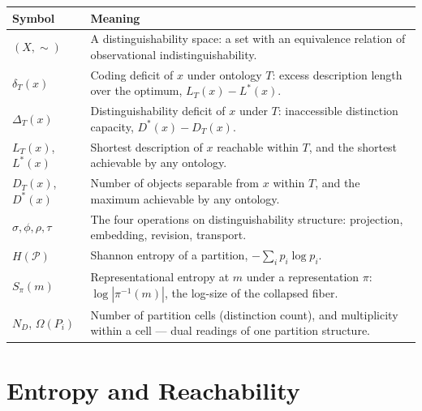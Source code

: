 \documentclass[12pt]{report}
\begin{document}
\begin{center}
\begin{tabular}{lp{4.6in}}
\hline
Symbol & Meaning \\
\hline
$(X,\sim)$ & A distinguishability space: a set with an equivalence
relation of observational indistinguishability. \\
$\delta_T(x)$ & Coding deficit of $x$ under ontology $T$: excess
description length over the optimum, $L_T(x) - L^*(x)$. \\
$\Delta_T(x)$ & Distinguishability deficit of $x$ under $T$: inaccessible
distinction capacity, $D^*(x) - D_T(x)$. \\
$L_T(x)$, $L^*(x)$ & Shortest description of $x$ reachable within $T$,
and the shortest achievable by any ontology. \\
$D_T(x)$, $D^*(x)$ & Number of objects separable from $x$ within $T$,
and the maximum achievable by any ontology. \\
$\sigma, \phi, \rho, \tau$ & The four operations on distinguishability
structure: projection, embedding, revision, transport. \\
$H(\mathcal{P})$ & Shannon entropy of a partition, $-\sum_i p_i \log p_i$. \\
$S_\pi(m)$ & Representational entropy at $m$ under a representation
$\pi$: $\log|\pi^{-1}(m)|$, the log-size of the collapsed fiber. \\
$N_D$, $\Omega(P_i)$ & Number of partition cells (distinction count),
and multiplicity within a cell --- dual readings of one partition
structure. \\
\hline
\end{tabular}
\end{center}

\section*{Entropy and Reachability}
\end{document}
